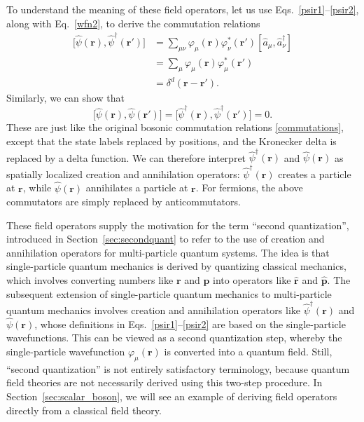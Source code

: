 \documentclass[prx,12pt]{revtex4-2}
\begin{document}
To understand the meaning of these field operators, let us use
Eqs.~\eqref{psir1}--\eqref{psir2}, along with Eq.~\eqref{wfn2}, to
derive the commutation relations
\begin{align}
  \big[\hat{\psi}(\mathbf{r}), \hat{\psi}^\dagger(\mathbf{r}')\big]
  &= \sum_{\mu\nu} \varphi_\mu(\mathbf{r}) \varphi_\nu^*(\mathbf{r}')
  \left[\hat{a}_\mu, \hat{a}_\nu^\dagger\right] \\
  &= \sum_{\mu} \varphi_\mu(\mathbf{r}) \varphi_\mu^*(\mathbf{r}') \\
  &= \delta^d(\mathbf{r}-\mathbf{r}').
\end{align}
Similarly, we can show that
\begin{equation}
  \big[\hat{\psi}(\mathbf{r}), \hat{\psi}(\mathbf{r}')\big]
  = \big[\hat{\psi}^\dagger(\mathbf{r}), \hat{\psi}^\dagger(\mathbf{r}')\big]
  = 0.
\end{equation}
These are just like the original bosonic commutation relations
\eqref{commutations}, except that the state labels replaced by
positions, and the Kronecker delta is replaced by a delta function.
We can therefore interpret $\hat{\psi}^\dagger(\mathbf{r})$ and
$\hat{\psi}(\mathbf{r})$ as spatially localized creation and
annihilation operators: $\hat{\psi}^\dagger(\mathbf{r})$ creates a
particle at $\mathbf{r}$, while $\hat{\psi}(\mathbf{r})$ annihilates a
particle at $\mathbf{r}$.  For fermions, the above commutators are
simply replaced by anticommutators.

\label{second_quantization_terminology}
These field operators supply the motivation for the term ``second
quantization'', introduced in Section~\ref{sec:secondquant} to refer
to the use of creation and annihilation operators for multi-particle
quantum systems.  The idea is that single-particle quantum mechanics
is derived by quantizing classical mechanics, which involves
converting numbers like $\mathbf{r}$ and $\mathbf{p}$ into operators
like $\hat{\mathbf{r}}$ and $\hat{\mathbf{p}}$.  The subsequent
extension of single-particle quantum mechanics to multi-particle
quantum mechanics involves creation and annihilation operators like
$\hat{\psi}^\dagger(\mathbf{r})$ and $\hat{\psi}(\mathbf{r})$, whose
definitions in Eqs.~\eqref{psir1}--\eqref{psir2} are based on the
single-particle wavefunctions.  This can be viewed as a second
quantization step, whereby the single-particle wavefunction
$\varphi_\mu(\mathbf{r})$ is converted into a quantum field.  Still,
``second quantization'' is not entirely satisfactory terminology,
because quantum field theories are not necessarily derived using this
two-step procedure.  In Section~\ref{sec:scalar_boson}, we will see an
example of deriving field operators directly from a classical field
theory.
\end{document}
